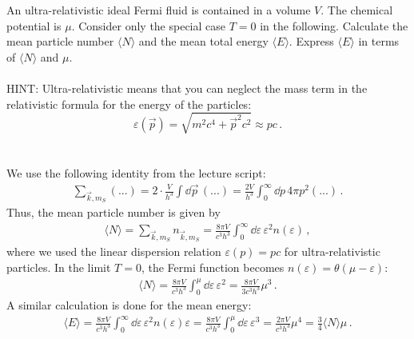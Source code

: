 An ultra-relativistic ideal Fermi fluid is contained in a 
volume $V$. The chemical potential is $\mu$. Consider only 
the special case $T=0$ in the following. Calculate the mean 
particle number $\langle N \rangle$ and the mean total energy
$\langle E \rangle$.
Express $\langle E \rangle$ in terms of $\langle N \rangle$ and 
$\mu$. \\
\\
HINT: Ultra-relativistic means that you can neglect the mass 
term in the relativistic formula for the energy of the 
particles:
\begin{equation}
    \varepsilon(\vec p)=\sqrt{m^2c^4+\vec p^2c^2}
    \approx pc \,.
\end{equation} \\
\\
We use the following identity from the lecture script:
\begin{align}
    \sum_{\vec k,m_S} (...)
    =2\cdot\frac{V}{h^3}\int\dd\vec p \, (...)
    =\frac{2V}{h^3}\int_0^{\infty}\dd p \, 4 \pi p^2 (...) \,.
\end{align}
Thus, the mean particle number is given by
\begin{align}
    \langle N \rangle = \sum_{\vec k,m_S} n_{\vec k,m_S}
    =\frac{8\pi V}{c^3h^3}\int_0^{\infty}\dd\varepsilon \, \varepsilon^2 n(\varepsilon) \,,
\end{align}
where we used the linear dispersion relation $\varepsilon(p)=pc$ for 
ultra-relativistic particles. In the limit $T=0$, the Fermi function
becomes $n(\varepsilon) = \theta(\mu - \varepsilon)$:
\begin{align}
    \langle N \rangle
    =\frac{8\pi V}{c^3h^3}\int_0^{\mu}\dd\varepsilon \, \varepsilon^2 
    =\frac{8\pi V}{3c^3h^3} \mu^3 \,.
\end{align}
A similar calculation is done for the mean energy:
\begin{align}
    \langle E \rangle
    =\frac{8\pi V}{c^3h^3}\int_0^{\infty}\dd\varepsilon \, \varepsilon^2 n(\varepsilon)\varepsilon
    =\frac{8\pi V}{c^3h^3}\int_0^{\mu}\dd\varepsilon \, \varepsilon^3
    =\frac{2\pi V}{c^3h^3}\mu^4
    =\frac{3}{4} \langle N \rangle \mu \,.
\end{align}